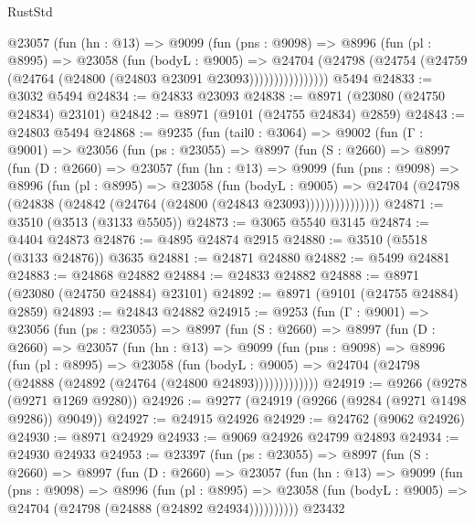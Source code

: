 \begin{lexlean}{RustStd}
\begin{coremodule}
              @23057
                (fun (hn : @13) =>
                @9099
                  (fun (pns : @9098) =>
                  @8996
                    (fun (pl : @8995) =>
                    @23058
                      (fun (bodyL : @9005) =>
                      @24704
                        (@24798
                          (@24754 (@24759 (@24764 (@24800 (@24803 @23091 @23093))))))))))))))))
    @5494
@24833 := @3032 @5494
@24834 := @24833 @23093
@24838 := @8971 (@23080 (@24750 @24834) @23101)
@24842 := @8971 (@9101 (@24755 @24834) @2859)
@24843 := @24803 @5494
@24868 := @9235
    (fun (tail0 : @3064) =>
    @9002
      (fun (Γ : @9001) =>
      @23056
        (fun (ps : @23055) =>
        @8997
          (fun (S : @2660) =>
          @8997
            (fun (D : @2660) =>
            @23057
              (fun (hn : @13) =>
              @9099
                (fun (pns : @9098) =>
                @8996
                  (fun (pl : @8995) =>
                  @23058
                    (fun (bodyL : @9005) =>
                    @24704 (@24798 (@24838 (@24842 (@24764 (@24800 (@24843 @23093)))))))))))))))
@24871 := @3510 (@3513 (@3133 @5505))
@24873 := @3065 @5540 @3145
@24874 := @4404 @24873
@24876 := @4895 @24874 @2915
@24880 := @3510 (@5518 (@3133 @24876)) @3635
@24881 := @24871 @24880
@24882 := @5499 @24881
@24883 := @24868 @24882
@24884 := @24833 @24882
@24888 := @8971 (@23080 (@24750 @24884) @23101)
@24892 := @8971 (@9101 (@24755 @24884) @2859)
@24893 := @24843 @24882
@24915 := @9253
    (fun (Γ : @9001) =>
    @23056
      (fun (ps : @23055) =>
      @8997
        (fun (S : @2660) =>
        @8997
          (fun (D : @2660) =>
          @23057
            (fun (hn : @13) =>
            @9099
              (fun (pns : @9098) =>
              @8996
                (fun (pl : @8995) =>
                @23058
                  (fun (bodyL : @9005) =>
                  @24704 (@24798 (@24888 (@24892 (@24764 (@24800 @24893)))))))))))))
@24919 := @9266 (@9278 (@9271 @1269 @9280))
@24926 := @9277 (@24919 (@9266 (@9284 (@9271 @1498 @9286)) @9049))
@24927 := @24915 @24926
@24929 := @24762 (@9062 @24926)
@24930 := @8971 @24929
@24933 := @9069 @24926 @24799 @24893
@24934 := @24930 @24933
@24953 := @23397
    (fun (ps : @23055) =>
    @8997
      (fun (S : @2660) =>
      @8997
        (fun (D : @2660) =>
        @23057
          (fun (hn : @13) =>
          @9099
            (fun (pns : @9098) =>
            @8996
              (fun (pl : @8995) =>
              @23058 (fun (bodyL : @9005) => @24704 (@24798 (@24888 (@24892 @24934))))))))))
    @23432

\end{coremodule}
\end{lexlean}
